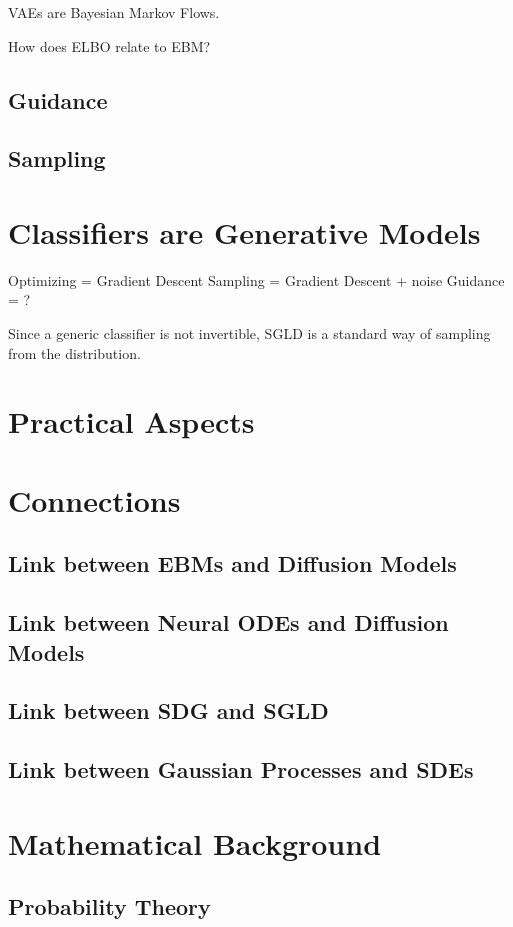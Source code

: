 \documentclass[a4paper, 11pt]{article}
\begin{document}
VAEs are Bayesian Markov Flows.

How does ELBO relate to EBM? 



\subsection{Guidance}

\subsection{Sampling}


\section{Classifiers are Generative Models}

Optimizing = Gradient Descent
Sampling = Gradient Descent + noise
Guidance = ?

Since a generic classifier is not invertible, SGLD is a standard way of sampling from the distribution.

\section{Practical Aspects}

\section{Connections}
\subsection{Link between EBMs and Diffusion Models}
\subsection{Link between Neural ODEs and Diffusion Models}
\subsection{Link between SDG and SGLD}
\subsection{Link between Gaussian Processes and SDEs}

\appendix
\section{Mathematical Background}
\subsection{Probability Theory}


 

\end{document}
